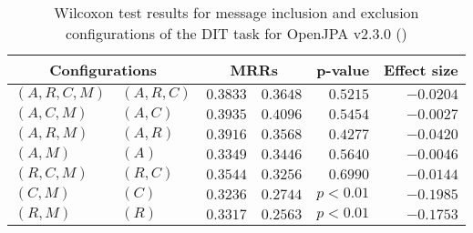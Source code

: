 
\begin{table}
\begin{spacing}{1.2}
\centering
\caption{Wilcoxon test results for message inclusion and exclusion configurations of the DIT task for OpenJPA v2.3.0 (\ctwo)}
\label{table:versus-wilcox-openjpa-dit-message}
\begin{tabular}{ll|rr|rr}
\toprule
      \multicolumn{2}{c|}{Configurations} &                \multicolumn{2}{c|}{MRRs} &             p-value & Effect size \\
\midrule
 $(A,R,C,M)$ &  $(A,R,C)$ &  $\bm{0.3833}$ &       $0.3648$ & $0.5215$ &   $-0.0204$ \\
   $(A,C,M)$ &    $(A,C)$ &       $0.3935$ &  $\bm{0.4096}$ & $0.5454$ &   $-0.0027$ \\
   $(A,R,M)$ &    $(A,R)$ &  $\bm{0.3916}$ &       $0.3568$ & $0.4277$ &   $-0.0420$ \\
     $(A,M)$ &      $(A)$ &       $0.3349$ &  $\bm{0.3446}$ & $0.5640$ &   $-0.0046$ \\
   $(R,C,M)$ &    $(R,C)$ &  $\bm{0.3544}$ &       $0.3256$ & $0.6990$ &   $-0.0144$ \\
     $(C,M)$ &      $(C)$ &  $\bm{0.3236}$ &       $0.2744$ & $p<0.01$ &   $-0.1985$ \\
     $(R,M)$ &      $(R)$ &  $\bm{0.3317}$ &       $0.2563$ & $p<0.01$ &   $-0.1753$ \\
\bottomrule
\end{tabular}

\end{spacing}
\end{table}

